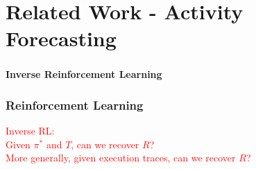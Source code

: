 \section{Related Work - Activity Forecasting}

\begin{frame}
	\frametitle{}
	
	\Huge
	
	\vspace{0.5cm}
	
	\begin{center}
		\textbf{Inverse Reinforcement Learning}
	\end{center}
\end{frame}

\begin{frame}
	\frametitle{Reinforcement Learning}
	
	\begin{center}
	\end{center}
	
	\vspace{-0.5cm}
	
	\textcolor{red}{Inverse RL:} \\
	\hspace{1cm}\textcolor{red}{Given $ \pi^* $ and $ T $, can we recover $ R $?\\
	\hspace{1cm}More generally, given execution traces, can we recover $ R $?}
\end{frame}

